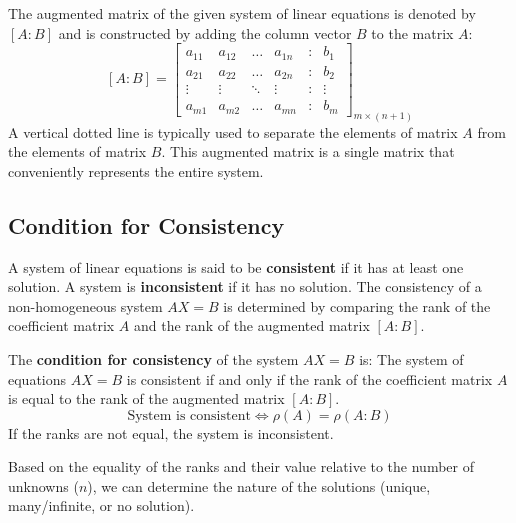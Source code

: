 \documentclass{article}
\begin{document}
The augmented matrix of the given system of linear equations is denoted by $[A:B]$ and is constructed by adding the column vector $B$ to the matrix $A$:
\[ [A:B] = \begin{bmatrix} a_{11} & a_{12} & \dots & a_{1n} & : & b_1 \\ a_{21} & a_{22} & \dots & a_{2n} & : & b_2 \\ \vdots & \vdots & \ddots & \vdots & : & \vdots \\ a_{m1} & a_{m2} & \dots & a_{mn} & : & b_m \end{bmatrix}_{m \times (n+1)} \]
A vertical dotted line is typically used to separate the elements of matrix $A$ from the elements of matrix $B$. This augmented matrix is a single matrix that conveniently represents the entire system.

\subsection{Condition for Consistency}

A system of linear equations is said to be \textbf{consistent} if it has at least one solution. A system is \textbf{inconsistent} if it has no solution. The consistency of a non-homogeneous system $AX = B$ is determined by comparing the rank of the coefficient matrix $A$ and the rank of the augmented matrix $[A:B]$.

The \textbf{condition for consistency} of the system $AX = B$ is:
The system of equations $AX = B$ is consistent if and only if the rank of the coefficient matrix $A$ is equal to the rank of the augmented matrix $[A:B]$.
\[ \text{System is consistent} \iff \rho(A) = \rho(A:B) \]
If the ranks are not equal, the system is inconsistent.

Based on the equality of the ranks and their value relative to the number of unknowns ($n$), we can determine the nature of the solutions (unique, many/infinite, or no solution).
\end{document}
